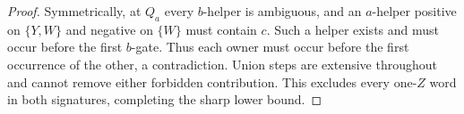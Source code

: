 \begin{proof}
Symmetrically, at $Q_a$ every $b$-helper is ambiguous, and an $a$-helper
positive on $\{Y,W\}$ and negative on $\{W\}$ must contain $c$.
Such a helper exists and must occur before the first $b$-gate.
Thus each owner must occur before the first occurrence of the other,
a contradiction. Union steps are extensive throughout and cannot remove
either forbidden contribution. This excludes every one-$Z$ word in both
signatures, completing the sharp lower bound.
\end{proof}
